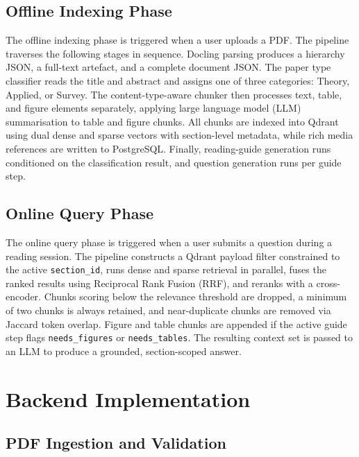 \documentclass[12pt,a4paper]{report}
\begin{document}
\subsection{Offline Indexing Phase}

The offline indexing phase is triggered when a user uploads a PDF. The pipeline
traverses the following stages in sequence. Docling parsing produces a
hierarchy JSON, a full-text artefact, and a complete document JSON. The paper
type classifier reads the title and abstract and assigns one of three
categories: Theory, Applied, or Survey. The content-type-aware chunker then
processes text, table, and figure elements separately, applying large language
model (LLM) summarisation to table and figure chunks. All chunks are indexed
into Qdrant using dual dense and sparse vectors with section-level metadata,
while rich media references are written to PostgreSQL. Finally, reading-guide
generation runs conditioned on the classification result, and question
generation runs per guide step.

\subsection{Online Query Phase}

The online query phase is triggered when a user submits a question during a
reading session. The pipeline constructs a Qdrant payload filter constrained to
the active \texttt{section\_id}, runs dense and sparse retrieval in parallel,
fuses the ranked results using Reciprocal Rank Fusion (RRF), and reranks with a
cross-encoder. Chunks scoring below the relevance threshold are dropped, a
minimum of two chunks is always retained, and near-duplicate chunks are removed
via Jaccard token overlap. Figure and table chunks are appended if the active
guide step flags \texttt{needs\_figures} or \texttt{needs\_tables}. The
resulting context set is passed to an LLM to produce a grounded, section-scoped
answer.

\section{Backend Implementation}

\subsection{PDF Ingestion and Validation}
\end{document}
